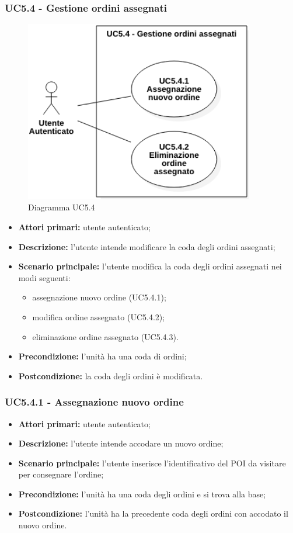 \subsubsection{UC5.4 - Gestione ordini assegnati}
\begin{figure}[h!]
    \includegraphics[width=10cm]{images/uc5.4.png}
    \caption{Diagramma UC5.4}
\end{figure}
\begin{itemize}
    \item \textbf{Attori primari:} utente autenticato;
    \item \textbf{Descrizione:} l'utente intende modificare la coda degli ordini assegnati;
    \item \textbf{Scenario principale:} l'utente modifica la coda degli ordini assegnati nei modi seguenti:
    \begin{itemize}
        \item assegnazione nuovo ordine (UC5.4.1);
        \item modifica ordine assegnato (UC5.4.2);
        \item eliminazione ordine assegnato (UC5.4.3).
    \end{itemize}
    \item \textbf{Precondizione:} l'unità ha una coda di ordini;
    \item \textbf{Postcondizione:} la coda degli ordini è modificata.
\end{itemize}

\subsubsection{UC5.4.1 - Assegnazione nuovo ordine}
\begin{itemize}
    \item \textbf{Attori primari:} utente autenticato;
    \item \textbf{Descrizione:} l'utente intende accodare un nuovo ordine;
    \item \textbf{Scenario principale:} l'utente inserisce l'identificativo del POI da visitare per consegnare l'ordine;
    \item \textbf{Precondizione:} l'unità ha una coda degli ordini e si trova alla base;
    \item \textbf{Postcondizione:} l'unità ha la precedente coda degli ordini con accodato il nuovo ordine.
\end{itemize}

